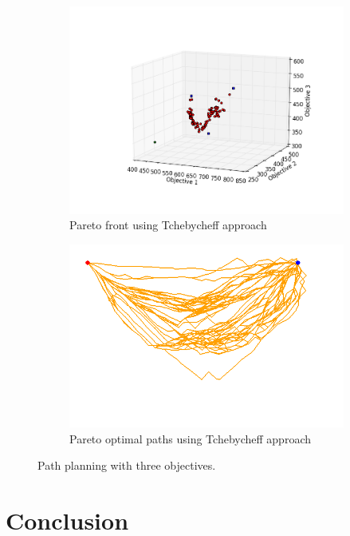 \documentclass[conference]{IEEEtran}
\begin{document}
\begin{figure}
\begin{subfigure}[b]{0.45\linewidth}
		\centering
		\includegraphics[width=\textwidth]{fig/sim7-3obj/PF07-MORRT2.png}
		\caption{Pareto front using Tchebycheff approach}
		\label{fig:sim:many:pf:b}
	\end{subfigure} 
	\begin{subfigure}[b]{0.45\linewidth}
		\centering
		\includegraphics[width=\textwidth]{fig/sim7-3obj/MORRTstar02-ALL.png}
		\caption{Pareto optimal paths using Tchebycheff approach}
		\label{fig:sim:many:sols:b}
	\end{subfigure}
	\caption{Path planning with three objectives.}
	\label{fig:sim:many}
\end{figure}

\section{Conclusion} 
\label{sec:conclusion}
\end{document}
